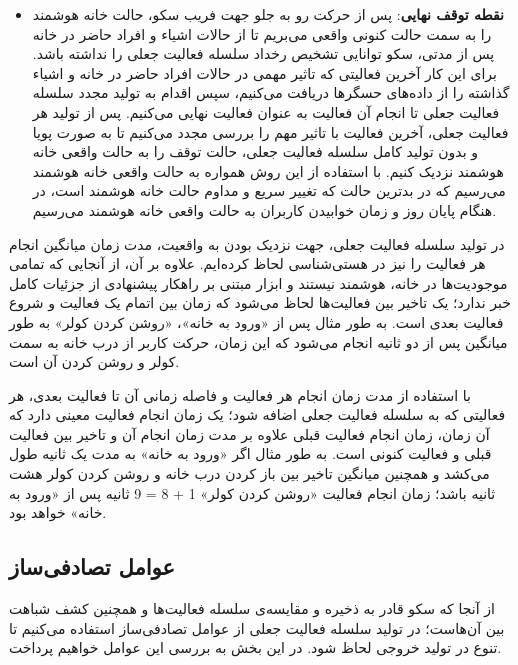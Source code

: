 \begin{itemize}
\item \textbf{نقطه توقف نهایی}: پس از حرکت رو به جلو جهت فریب سکو، حالت خانه هوشمند را به سمت حالت کنونی واقعی می‌بریم تا از حالات اشیاء و افراد حاضر در خانه پس از مدتی، سکو توانایی تشخیص رخداد سلسله فعالیت جعلی را نداشته باشد. برای این کار آخرین فعالیتی که تاثیر مهمی در حالات افراد حاضر در خانه و اشیاء گذاشته را از داده‌های حسگرها دریافت می‌کنیم، سپس اقدام به تولید مجدد سلسله فعالیت جعلی تا انجام آن فعالیت به عنوان فعالیت نهایی می‌کنیم. پس از تولید هر فعالیت جعلی، آخرین فعالیت با تاثیر مهم را بررسی مجدد می‌کنیم تا به صورت پویا و بدون تولید کامل سلسله فعالیت جعلی، حالت توقف را به حالت واقعی خانه هوشمند نزدیک کنیم. با استفاده از این روش همواره به حالت واقعی خانه هوشمند می‌رسیم که در بدترین حالت که تغییر سریع و مداوم حالت خانه هوشمند است، در هنگام پایان روز و زمان خوابیدن کاربران به حالت واقعی خانه هوشمند می‌رسیم.
‌\end{itemize}

در تولید سلسله فعالیت جعلی، جهت نزدیک بودن به واقعیت، مدت زمان میانگین انجام هر فعالیت را نیز در هستی‌شناسی لحاظ کرده‌ایم. علاوه بر آن، از آنجایی که تمامی موجودیت‌ها در خانه، هوشمند نیستند و ابزار مبتنی بر راهکار پیشنهادی از جزئیات کامل خبر ندارد؛ یک تاخیر بین فعالیت‌ها لحاظ می‌شود که زمان بین اتمام یک فعالیت و شروع فعالیت بعدی است. به طور مثال پس از «ورود به خانه»، «روشن کردن کولر» به طور میانگین پس از دو ثانیه انجام می‌شود که این زمان، حرکت کاربر از درب خانه به سمت کولر و روشن کردن آن است. 

با استفاده از مدت زمان انجام هر فعالیت و فاصله زمانی آن تا فعالیت بعدی، هر فعالیتی که به سلسله فعالیت جعلی اضافه شود؛ یک زمان انجام فعالیت معینی دارد که آن زمان، زمان انجام فعالیت قبلی علاوه بر مدت زمان انجام آن و تاخیر بین فعالیت قبلی و فعالیت کنونی است. به طور مثال اگر «ورود به خانه» به مدت یک ثانیه طول می‌کشد و همچنین میانگین تاخیر بین باز کردن درب خانه و روشن کردن کولر هشت ثانیه باشد؛ زمان انجام فعالیت «روشن کردن کولر» 1 + 8 = 9 ثانیه پس از «ورود به خانه» خواهد بود.

\subsection{‌عوامل تصادفی‌ساز}

از آنجا که سکو قادر به ذخیره و مقایسه‌ی سلسله فعالیت‌ها و همچنین کشف شباهت بین آن‌هاست؛ در تولید سلسله فعالیت جعلی از عوامل تصادفی‌ساز استفاده می‌کنیم تا تنوع در تولید خروجی لحاظ شود. در این بخش به بررسی این عوامل خواهیم پرداخت.

